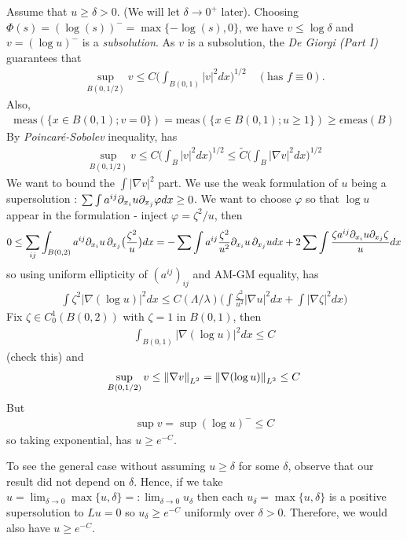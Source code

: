 \documentclass[12pt,a4paper]{article}
\newenvironment{proof}
{\begin{changemargin}{0.5cm}{0.5cm} 
	}%
	{\end{changemargin}
}
\newenvironment{p}
{\begin{proof} 
	}%
	{\end{proof}
}
\begin{document}
\begin{p}
\pf Assume that $u\geq \delta >0$. (We will let $\delta \rightarrow 0^+$ later). Choosing $\Phi(s) = (\log(s))^- = \max \{-\log(s), 0\}$, we have $v \leq \log \delta$ and $v =(\log u)^-$ is a \emph{subsolution}. As $v$ is a subsolution, the \emph{De Giorgi (Part I)} guarantees that
\begin{align*}
\sup_{B(0,1/2)} v \leq C\Big( \int_{B(0,1)} |v|^2 dx \Big)^{1/2} \quad (\text{has } f\equiv 0).
\end{align*}
Also,
\begin{align*}
\text{meas}(\{x\in B(0,1) ; v=0\}) = \text{meas}(\{x\in B(0,1) ; u\geq 1\}) \geq \epsilon \text{meas}(B)
\end{align*}
By \emph{Poincar\'e-Sobolev} inequality, has
\begin{align*}
\sup_{B(0, 1/2)} v \leq C\Big( \int_B |v|^2 dx \Big)^{1/2} \leq \tilde{C} \Big( \int_B |\nabla v|^2 dx\Big)^{1/2}
\end{align*}
We want to bound the $\int |\nabla v|^2$ part. We use the weak formulation of $u$ being a supersolution : $\sum \int a^{ij}\partial_{x_i} u\partial_{x_j} \varphi dx \geq 0$. We want to choose $\varphi$ so that $\log u$ appear in the formulation - inject $\varphi = \zeta^2 /u$, then
\begin{align*}
0 \leq \sum_{ij} \int_{B(0,2)} a^{ij} \partial_{x_i} u \, \partial_{x_j} \big(\frac{\zeta^2}{u} \big) dx = - \sum \int a^{ij} \frac{\zeta^2}{u^2} \partial_{x_i} u \, \partial_{x_j} u dx + 2\sum \int \frac{\zeta a^{ij} \partial_{x_i}u \partial_{x_j} \zeta}{u} dx
\end{align*}
so using uniform ellipticity of $(a^{ij})_{ij}$ and AM-GM equality, has
\begin{align*}
 \int \zeta^2 |\nabla (\log u)|^2 dx \leq C(\Lambda/\lambda)\Big( \int \frac{\zeta^2}{u^2} |\nabla u|^2 dx + \int |\nabla \zeta|^2 dx \Big)
\end{align*}
Fix $\zeta \in C_0^1(B(0,2))$ with $\zeta =1$ in $B(0,1)$, then
\begin{align*}
\int_{B(0,1)} |\nabla (\log u)|^2 dx \leq C 
\end{align*}
(check this) and
\begin{align*}
\sup_{B(0,1/2)} v \leq \snorms{\nabla v}{L^2} = \snorms{\nabla (\log u)}{L^2} \leq C
\end{align*}
But
\begin{align*}
\sup v = \sup(\log u)^- \leq C
\end{align*}
so taking exponential, has $u\geq e^{-C}$.
\s

To see the general case without assuming $u\geq \delta$ for some $\delta$, observe that our result did not depend on $\delta$. Hence, if we take $u = \lim_{\delta \rightarrow 0} \max \{u, \delta\} =: \lim_{\delta \rightarrow 0} u_{\delta}$ then each $u_{\delta} = \max \{u, \delta\}$ is a positive supersolution to $Lu =0$ so $u_{\delta} \geq e^{-C}$ uniformly over $\delta>0$. Therefore, we would also have $u\geq e^{-C}$.
 
\eop 
\end{p}
\s
\end{document}
